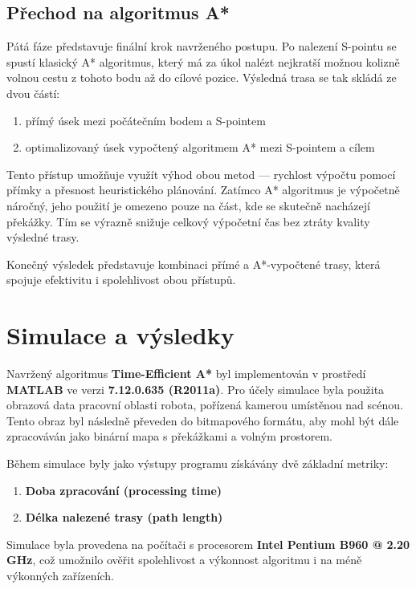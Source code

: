 \documentclass[10pt, a4paper]{article}
\begin{document}
\newpage
\subsection{Přechod na algoritmus A*}
Pátá fáze představuje finální krok navrženého postupu.
Po nalezení S-pointu se spustí klasický A* algoritmus, který má za úkol nalézt nejkratší možnou kolizně volnou cestu z tohoto bodu až do cílové pozice.
Výsledná trasa se tak skládá ze dvou částí:
\begin{enumerate}
    \item
    přímý úsek mezi počátečním bodem a S-pointem
    \item
    optimalizovaný úsek vypočtený algoritmem A* mezi S-pointem a cílem
\end{enumerate}

Tento přístup umožňuje využít výhod obou metod — rychlost výpočtu pomocí přímky a přesnost heuristického plánování.
Zatímco A* algoritmus je výpočetně náročný, jeho použití je omezeno pouze na část, kde se skutečně nacházejí překážky.
Tím se výrazně snižuje celkový výpočetní čas bez ztráty kvality výsledné trasy.

Konečný výsledek představuje kombinaci přímé a A*-vypočtené trasy, která spojuje efektivitu i spolehlivost obou přístupů.

\section{Simulace a výsledky}

Navržený algoritmus \textbf{Time-Efficient A*} byl implementován v prostředí \textbf{MATLAB} ve verzi \textbf{7.12.0.635 (R2011a)}.
Pro účely simulace byla použita obrazová data pracovní oblasti robota, pořízená kamerou umístěnou nad scénou.
Tento obraz byl následně převeden do bitmapového formátu, aby mohl být dále zpracováván jako binární mapa s překážkami a volným prostorem.

Během simulace byly jako výstupy programu získávány dvě základní metriky:
\begin{enumerate}
    \item \textbf{Doba zpracování (processing time)}
    \item \textbf{Délka nalezené trasy (path length)}
\end{enumerate}

Simulace byla provedena na počítači s procesorem \textbf{Intel Pentium B960 @ 2.20 GHz}, což umožnilo ověřit spolehlivost a výkonnost algoritmu i na méně výkonných zařízeních.
\end{document}
